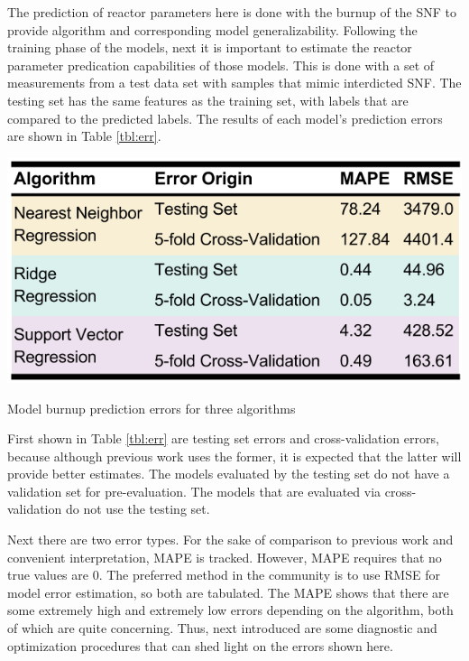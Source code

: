 The prediction of reactor parameters here is done with the burnup of the
\gls{SNF} to provide algorithm and corresponding model generalizability.
Following the training phase of the models, next it is important to estimate
the reactor parameter predication capabilities of those models. This is done
with a set of measurements from a test data set with samples that mimic
interdicted \gls{SNF}. The testing set has the same features as the training
set, with labels that are compared to the predicted labels. The results of each
model's prediction errors are shown in Table \ref{tbl:err}. 

\begin{table}[!htb]
  \centering
  \includegraphics[width=0.8\linewidth]{./chapters/demo_method/err.png}
  \caption{Model burnup prediction errors for three algorithms}
  \label{tbl:err}
\end{table}

First shown in Table \ref{tbl:err} are testing set errors and cross-validation
errors, because although previous work uses the former, it is expected that the
latter will provide better estimates.  The models evaluated by the testing set
do not have a validation set for pre-evaluation.  The models that are evaluated
via cross-validation do not use the testing set. 

Next there are two error types.  For the sake of comparison to previous work
and convenient interpretation, \gls{MAPE} is tracked. However, \gls{MAPE}
requires that no true values are $0$.  The preferred method in the community is
to use \gls{RMSE} for model error estimation, so both are tabulated.  The
\gls{MAPE} shows that there are some extremely high and extremely low errors
depending on the algorithm, both of which are quite concerning.  Thus, next
introduced are some diagnostic and optimization procedures that can shed light
on the errors shown here.

